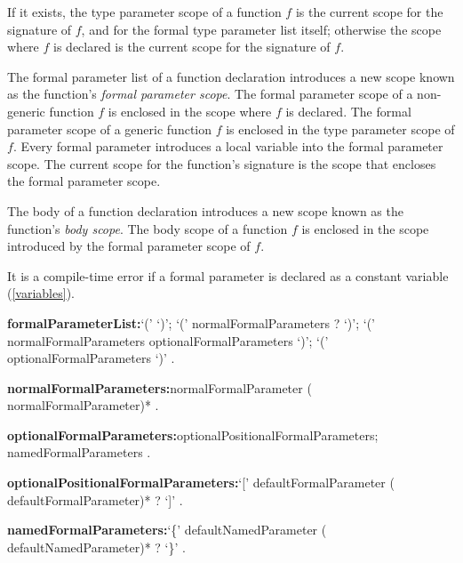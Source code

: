 \documentclass{article}
\begin{document}
\LMHash{}
If it exists, the type parameter scope of a function $f$ is the current scope for the signature of $f$, and for the formal type parameter list itself;
otherwise the scope where $f$ is declared is the current scope for the signature of $f$.


\LMHash{}
The formal parameter list of a function declaration introduces a new scope known as the function's {\em formal parameter scope}.
The formal parameter scope of a non-generic function $f$ is enclosed in the scope where $f$ is declared.
The formal parameter scope of a generic function $f$ is enclosed in the type parameter scope of $f$.
Every formal parameter introduces a local variable into the formal parameter scope.
The current scope for the function's signature is the scope that encloses the formal parameter scope.


\LMHash{}
The body of a function declaration introduces a new scope known as the function's {\em body scope}.
The body scope of a function $f$ is enclosed in the scope introduced by the formal parameter scope of $f$.



\LMHash{}
It is a compile-time error if a formal parameter is declared as a constant variable (\ref{variables}).

\begin{grammar}
{\bf formalParameterList:}`(' `)';
  `(' normalFormalParameters \gcomma{}? `)';
  `(' normalFormalParameters \gcomma{} optionalFormalParameters `)';
  `(' optionalFormalParameters `)'
  .

{\bf normalFormalParameters:}normalFormalParameter (\gcomma{} normalFormalParameter)*
  .

{\bf optionalFormalParameters:}optionalPositionalFormalParameters;
  namedFormalParameters
  .

{\bf optionalPositionalFormalParameters:}`[' defaultFormalParameter (\gcomma{} defaultFormalParameter)* \gcomma{}? `]'
  .

{\bf namedFormalParameters:}`\{' defaultNamedParameter (\gcomma{} defaultNamedParameter)* \gcomma{}? `\}'
  .
\end{grammar}
\end{document}
